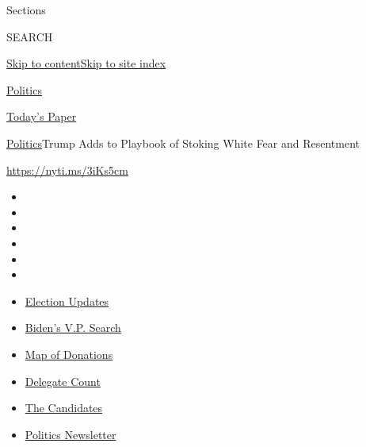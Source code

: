 Sections

SEARCH

\protect\hyperlink{site-content}{Skip to
content}\protect\hyperlink{site-index}{Skip to site index}

\href{https://www.nytimes.com/section/politics}{Politics}

\href{https://myaccount.nytimes.com/auth/login?response_type=cookie\&client_id=vi}{}

\href{https://www.nytimes.com/section/todayspaper}{Today's Paper}

\href{/section/politics}{Politics}\textbar{}Trump Adds to Playbook of
Stoking White Fear and Resentment

\url{https://nyti.ms/3iKs5cm}

\begin{itemize}
\item
\item
\item
\item
\item
\item
\end{itemize}

\begin{itemize}
\item
  \href{https://www.nytimes.com/2020/07/31/us/elections/biden-vs-trump.html?action=click\&pgtype=Article\&state=default\&region=TOP_BANNER\&context=storylines_menu}{Election
  Updates}
\item
  \href{https://www.nytimes.com/article/biden-vice-president-2020.html?action=click\&pgtype=Article\&state=default\&region=TOP_BANNER\&context=storylines_menu}{Biden's
  V.P. Search}
\item
  \href{https://www.nytimes.com/interactive/2020/07/24/us/politics/trump-biden-campaign-donors.html?action=click\&pgtype=Article\&state=default\&region=TOP_BANNER\&context=storylines_menu}{Map
  of Donations}
\item
  \href{https://www.nytimes.com/interactive/2020/us/elections/delegate-count-primary-results.html?action=click\&pgtype=Article\&state=default\&region=TOP_BANNER\&context=storylines_menu}{Delegate
  Count}
\item
  \href{https://www.nytimes.com/interactive/2019/us/politics/2020-presidential-candidates.html?action=click\&pgtype=Article\&state=default\&region=TOP_BANNER\&context=storylines_menu}{The
  Candidates}
\item
  \href{https://www.nytimes.com/newsletters/politics?action=click\&pgtype=Article\&state=default\&region=TOP_BANNER\&context=storylines_menu}{Politics
  Newsletter}
\end{itemize}

